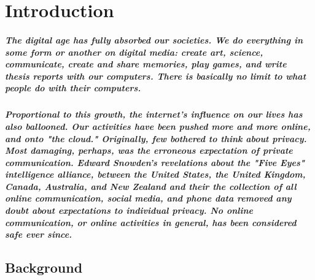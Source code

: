 




\chapter{Introduction}

\paragraph{The digital age has fully absorbed our societies. We do everything in some form or another on digital media: create art, science, communicate, create and share memories, play games, and write thesis reports with our computers. There is basically no limit to what people do with their computers.}

\paragraph{Proportional to this growth, the internet's influence on our lives has also ballooned. Our activities have been pushed more and more online, and onto "the cloud." Originally, few bothered to think about privacy. Most damaging, perhaps, was the erroneous expectation of private communication. Edward Snowden's revelations about the "Five Eyes" intelligence alliance, between the United States, the United Kingdom, Canada, Australia, and New Zealand and their the collection of all online communication, social media, and phone data removed any doubt about expectations to individual privacy. No online communication, or online activities in general, has been considered safe ever since.}


\section{Background}

